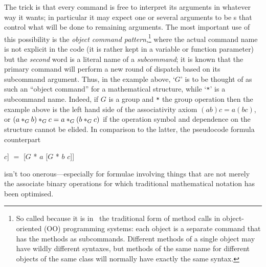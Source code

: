 \documentclass{mtmtcl}
\theoremstyle{plain}
\theoremstyle{remark}
\begin{document}
The trick is that every command is free to interpret its arguments in 
whatever way it wants; in particular it may expect one or several 
arguments to be s that control what will be done to 
remaining arguments. The most important use of this 
possibility is the \emph{object command pattern},\footnote{
  So called because it is in \Tcl\ the traditional form of method 
  calls in object-oriented (OO) programming systems: each object is 
  a separate command that has the methods as subcommands. Different 
  methods of a single object may have wildly different syntaxes, but 
  methods of the same name for different objects of the same class 
  will normally have exactly the same syntax.
} where the actual 
command name is not explicit in the code (it is rather kept in a 
variable or function parameter) but the \emph{second} word is a 
literal name of a \emph{subcommand}; it is known that the primary 
command will perform a new round of dispatch based on its subcommand 
argument. Thus, in the example above, `$G$' is to be thought of as 
such an ``object command'' for a mathematical structure, while 
`\texttt{*}' is a subcommand name. Indeed, if $G$ is a group and 
\texttt{*} the group operation then the example above is the left 
hand side of the associativity axiom \((ab)c = a(bc)\), or \((a 
*_G\nobreak b) *_G c = a *_G (b *_G\nobreak c)\) if the operation 
symbol and dependence on the structure cannot be elided. In 
comparison to the latter, the pseudocode formula counterpart
\begin{displaysyntax}
  [$G$ * [$G$ * $a$ $b$] $c$] ${}={}$ [$G$ * $a$ [$G$ * $b$ $c$]]
\end{displaysyntax}
isn't too onerous---especially for formulae involving things that are 
not merely the associate binary operations for which traditional 
mathematical notation has been optimised.
\end{document}
